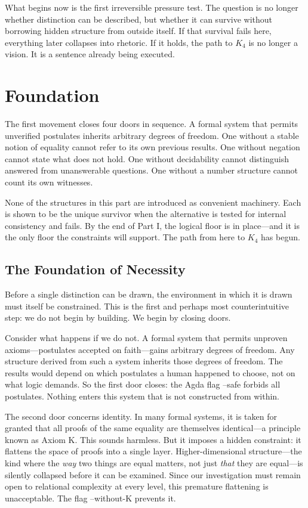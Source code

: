 \documentclass[11pt,a4paper]{book}
\def\texttt#1{#1}%
\begin{document}
What begins now is the first irreversible pressure test. The question is no longer whether distinction can be described, but whether it can survive without borrowing hidden structure from outside itself. If that survival fails here, everything later collapses into rhetoric. If it holds, the path to $K_4$ is no longer a vision. It is a sentence already being executed.

\part{Foundation}

The first movement closes four doors in sequence. A formal system that permits unverified postulates inherits arbitrary degrees of freedom. One without a stable notion of equality cannot refer to its own previous results. One without negation cannot state what does not hold. One without decidability cannot distinguish answered from unanswerable questions. One without a number structure cannot count its own witnesses.

None of the structures in this part are introduced as convenient machinery. Each is shown to be the unique survivor when the alternative is tested for internal consistency and fails. By the end of Part I, the logical floor is in place---and it is the only floor the constraints will support. The path from here to $K_4$ has begun.

\chapter{The Foundation of Necessity}

Before a single distinction can be drawn, the environment in which it is drawn must itself be constrained. This is the first and perhaps most counterintuitive step: we do not begin by building. We begin by closing doors.

Consider what happens if we do not. A formal system that permits unproven axioms—postulates accepted on faith—gains arbitrary degrees of freedom. Any structure derived from such a system inherits those degrees of freedom. The results would depend on which postulates a human happened to choose, not on what logic demands. So the first door closes: the Agda flag \texttt{--safe} forbids all postulates. Nothing enters this system that is not constructed from within.

The second door concerns identity. In many formal systems, it is taken for granted that all proofs of the same equality are themselves identical—a principle known as Axiom K. This sounds harmless. But it imposes a hidden constraint: it flattens the space of proofs into a single layer. Higher-dimensional structure—the kind where the \textit{way} two things are equal matters, not just \textit{that} they are equal—is silently collapsed before it can be examined. Since our investigation must remain open to relational complexity at every level, this premature flattening is unacceptable. The flag \texttt{--without-K} prevents it.
\end{document}
